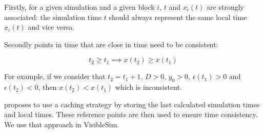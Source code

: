 \documentclass[11pt]{article}
\begin{document}
Firstly, for a given simulation and a given block $i$, $t$ and $x_i(t)$ are strongly associated: the simulation time $t$ should always represent the same local time $x_i(t)$ and vice versa.

Secondly points in time that are close in time need to be consistent:

\begin{equation}
t_2 \geq t_1 \implies x(t_2) \geq x(t_1)
\label{eq:consistency}
\end{equation}

For example, if we consider that $t_2 = t_1 + 1$, $D > 0$, $y_0 > 0$, $\epsilon(t_1) > 0$ and $\epsilon(t_2) < 0$, then $x(t_2) < x(t_1)$ which is inconsistent.

\cite{ring2010clock} proposes to use a caching strategy by storing the last calculated simulation times and local times. These reference points are then used to ensure time consistency. We use that approach in VisibleSim.



\end{document}
